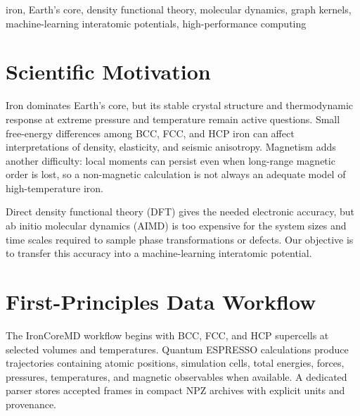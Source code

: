 \documentclass[conference]{IEEEtran}
\title{\SummaryTitle}
\author{\IEEEauthorblockN{\SummaryAuthor}
\IEEEauthorblockA{\SummaryAffiliation}}
\begin{document}
\maketitle

\begin{abstract}
Earth's inner core cannot be sampled directly, and experiments at simultaneous core pressures and temperatures remain difficult. We are building a first-principles and machine-learning workflow to determine how BCC, FCC, and HCP iron respond under these conditions. Quantum ESPRESSO molecular dynamics supplies energies, forces, stresses, and magnetic observables; temperature-dependent effective potential analysis supplies phonons and free energies. A Gaussian-process model based on graph-kernel structural similarity provides a route toward larger systems and longer trajectories. The current benchmark reaches an energy MAE of 7.26 meV/atom and RMSE of 9.61 meV/atom on 156 evaluation configurations. Ongoing validation emphasizes forces, phase stability, equation-of-state behavior, and magnetic sensitivity rather than energy parity alone.
\end{abstract}

\begin{IEEEkeywords}
iron, Earth's core, density functional theory, molecular dynamics, graph kernels, machine-learning interatomic potentials, high-performance computing
\end{IEEEkeywords}

\section{Scientific Motivation}
Iron dominates Earth's core, but its stable crystal structure and thermodynamic response at extreme pressure and temperature remain active questions. Small free-energy differences among BCC, FCC, and HCP iron can affect interpretations of density, elasticity, and seismic anisotropy. Magnetism adds another difficulty: local moments can persist even when long-range magnetic order is lost, so a non-magnetic calculation is not always an adequate model of high-temperature iron.

Direct density functional theory (DFT) gives the needed electronic accuracy, but ab initio molecular dynamics (AIMD) is too expensive for the system sizes and time scales required to sample phase transformations or defects. Our objective is to transfer this accuracy into a machine-learning interatomic potential.

\section{First-Principles Data Workflow}
The IronCoreMD workflow begins with BCC, FCC, and HCP supercells at selected volumes and temperatures. Quantum ESPRESSO calculations produce trajectories containing atomic positions, simulation cells, total energies, forces, pressures, temperatures, and magnetic observables when available. A dedicated parser stores accepted frames in compact NPZ archives with explicit units and provenance.
\end{document}
